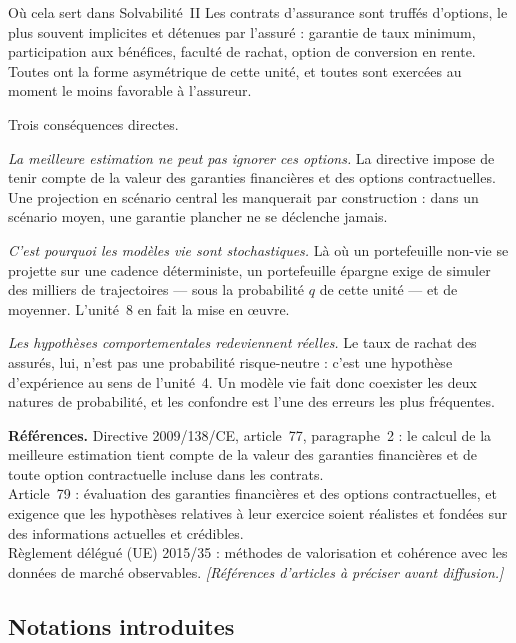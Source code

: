 \begin{pont}{Où cela sert dans Solvabilité~II}
Les contrats d'assurance sont truffés d'options, le plus souvent implicites et
détenues par l'assuré : garantie de taux minimum, participation aux bénéfices,
faculté de rachat, option de conversion en rente. Toutes ont la forme
asymétrique de cette unité, et toutes sont exercées au moment le moins favorable
à l'assureur.

\medskip
Trois conséquences directes.

\emph{La meilleure estimation ne peut pas ignorer ces options.} La directive
impose de tenir compte de la valeur des garanties financières et des options
contractuelles. Une projection en scénario central les manquerait par
construction : dans un scénario moyen, une garantie plancher ne se déclenche
jamais.

\emph{C'est pourquoi les modèles vie sont stochastiques.} Là où un portefeuille
non-vie se projette sur une cadence déterministe, un portefeuille épargne exige
de simuler des milliers de trajectoires --- sous la probabilité $q$ de cette
unité --- et de moyenner. L'unité~8 en fait la mise en \oe uvre.

\emph{Les hypothèses comportementales redeviennent réelles.} Le taux de rachat
des assurés, lui, n'est pas une probabilité risque-neutre : c'est une hypothèse
d'expérience au sens de l'unité~4. Un modèle vie fait donc coexister les deux
natures de probabilité, et les confondre est l'une des erreurs les plus
fréquentes.
\end{pont}

\begin{refreg}
\textbf{Références.} Directive 2009/138/CE, article~77, paragraphe~2 : le calcul
de la meilleure estimation tient compte de la valeur des garanties financières et
de toute option contractuelle incluse dans les contrats. \\
Article~79 : évaluation des garanties financières et des options contractuelles,
et exigence que les hypothèses relatives à leur exercice soient réalistes et
fondées sur des informations actuelles et crédibles. \\
Règlement délégué (UE) 2015/35 : méthodes de valorisation et cohérence avec les
données de marché observables. \emph{[Références d'articles à préciser avant
diffusion.]}
\end{refreg}

\subsection*{Notations introduites}
\begin{description}[leftmargin=2.4cm, style=nextline, font=\normalfont]
\end{description}
